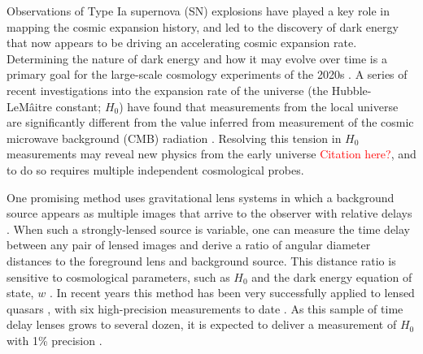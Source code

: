 \documentclass[12pt,dvipsnames]{article}
\begin{document}




Observations of Type Ia supernova (SN) explosions have played a key role in mapping the cosmic expansion history, and led to the discovery of dark energy that now appears to be driving an accelerating cosmic expansion rate\cite{riess_observational_1998,perlmutter_measurements_1999, Riess_large_2019}.  Determining the nature of dark energy and how it may evolve over time is a primary goal for the large-scale cosmology experiments of the 2020s \cite{amendola_cosmology_2013,spergel_wide_2015,Ivezic_lsst_2019}.
A series of recent investigations into the expansion rate of the universe (the Hubble-LeM\^aitre constant; $H_0$) have found that measurements from the local universe are significantly different from the value inferred from measurement of the cosmic microwave background (CMB) radiation \cite{Riess_large_2019,aghanim_planck_2018}.  Resolving this tension in $H_0$ measurements may reveal new physics from the early universe \textcolor{red}{Citation here?}, and to do so requires multiple 
independent cosmological probes. 

One promising method uses %
gravitational lens systems in which a background
source appears as multiple images that arrive to the observer with relative delays \cite{einstein_lens_1936}.
When such a strongly-lensed source is variable, one can measure the time delay between any pair of lensed images and derive a ratio of angular diameter distances to the foreground lens and background source. 
This distance ratio is sensitive to cosmological parameters, such as 
$H_0$  and the dark energy equation of state, $w$ \cite{refsdal_possibility_1964,coe_cosmological_2009,linder_lensing_2011}.
In recent years this method has been very successfully applied to lensed
quasars \cite{suyu_cosmology_2014,bonvin_cosmograil_2019}, with six high-precision measurements to date \cite{wong_h0licow_2019}. As this sample of time delay lenses grows to several dozen, it is expected to deliver a measurement of $H_0$ with 1\% precision \cite{suyu_cosological_2018}.  
\end{document}

